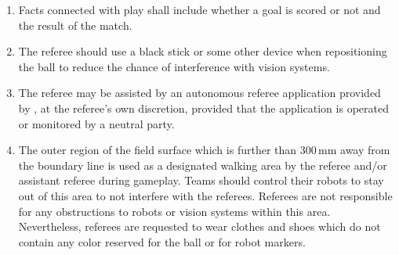 \begin{enumerate}
\item
Facts connected with play shall include whether a goal is scored or not and the result of the match.

\item
The referee should use a black stick or some other device when repositioning the ball to reduce the chance of interference with vision systems.

\item
The referee may be assisted by an autonomous referee application provided by
, at the referee's own discretion, provided that the
application is operated or monitored by a neutral party.
\item
The outer region of the field surface which is further than 300\,mm away from
the boundary line is used as a designated walking area by the referee and/or
assistant referee during gameplay.
Teams should control their robots to stay out of this area to not interfere with the referees.
Referees are not responsible for any obstructions to robots or vision systems within this area.
Nevertheless, referees are requested to wear clothes and shoes which do not contain any color reserved for the ball or for robot markers.

\end{enumerate}
